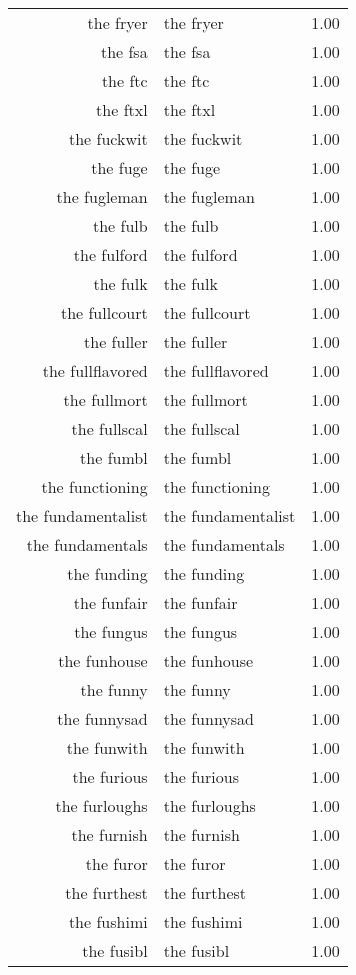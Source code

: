 \begin{table}[ht]
\begin{tabular}{rlr}
  the fryer & the fryer & 1.00 \\ 
  the fsa & the fsa & 1.00 \\ 
  the ftc & the ftc & 1.00 \\ 
  the ftxl & the ftxl & 1.00 \\ 
  the fuckwit & the fuckwit & 1.00 \\ 
  the fuge & the fuge & 1.00 \\ 
  the fugleman & the fugleman & 1.00 \\ 
  the fulb & the fulb & 1.00 \\ 
  the fulford & the fulford & 1.00 \\ 
  the fulk & the fulk & 1.00 \\ 
  the fullcourt & the fullcourt & 1.00 \\ 
  the fuller & the fuller & 1.00 \\ 
  the fullflavored & the fullflavored & 1.00 \\ 
  the fullmort & the fullmort & 1.00 \\ 
  the fullscal & the fullscal & 1.00 \\ 
  the fumbl & the fumbl & 1.00 \\ 
  the functioning & the functioning & 1.00 \\ 
  the fundamentalist & the fundamentalist & 1.00 \\ 
  the fundamentals & the fundamentals & 1.00 \\ 
  the funding & the funding & 1.00 \\ 
  the funfair & the funfair & 1.00 \\ 
  the fungus & the fungus & 1.00 \\ 
  the funhouse & the funhouse & 1.00 \\ 
  the funny & the funny & 1.00 \\ 
  the funnysad & the funnysad & 1.00 \\ 
  the funwith & the funwith & 1.00 \\ 
  the furious & the furious & 1.00 \\ 
  the furloughs & the furloughs & 1.00 \\ 
  the furnish & the furnish & 1.00 \\ 
  the furor & the furor & 1.00 \\ 
  the furthest & the furthest & 1.00 \\ 
  the fushimi & the fushimi & 1.00 \\ 
  the fusibl & the fusibl & 1.00 \\ 

\end{tabular}
\end{table}
